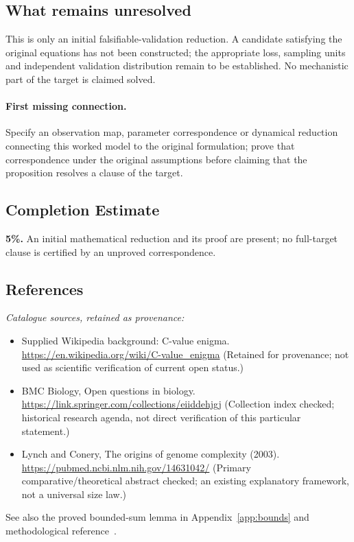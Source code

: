 \documentclass[11pt]{article}
\begin{document}
\subsection{What remains unresolved}
This is only an initial falsifiable-validation reduction. A candidate satisfying the original equations has not been constructed; the appropriate loss, sampling units and independent validation distribution remain to be established. No mechanistic part of the target is claimed solved.
\paragraph{First missing connection.} Specify an observation map, parameter correspondence or dynamical reduction connecting this worked model to the original formulation; prove that correspondence under the original assumptions before claiming that the proposition resolves a clause of the target.
\subsection{Completion Estimate}
\textbf{5\%.} An initial mathematical reduction and its proof are present; no full-target clause is certified by an unproved correspondence.
\subsection{References}
\noindent\emph{Catalogue sources, retained as provenance:}
\begin{itemize}
\item Supplied Wikipedia background: C-value enigma. \url{https://en.wikipedia.org/wiki/C-value_enigma} (Retained for provenance; not used as scientific verification of current open status.)
\item BMC Biology, Open questions in biology. \url{https://link.springer.com/collections/eiiddehjgj} (Collection index checked; historical research agenda, not direct verification of this particular statement.)
\item Lynch and Conery, The origins of genome complexity (2003). \url{https://pubmed.ncbi.nlm.nih.gov/14631042/} (Primary comparative/theoretical abstract checked; an existing explanatory framework, not a universal size law.)
\end{itemize}
\noindent See also the proved bounded-sum lemma in Appendix~\ref{app:bounds} and methodological reference~\cite{hoeffding}.
\clearpage


\appendix
\end{document}
